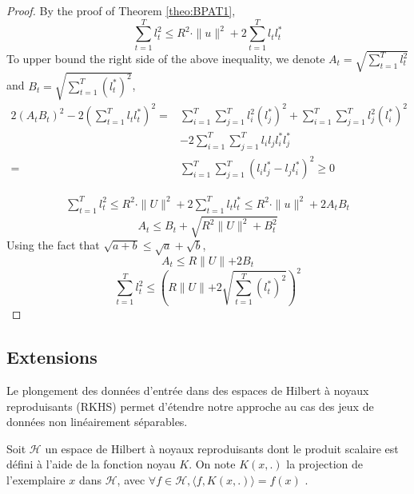 \documentclass[twocolumn]{article}
\begin{document}
\begin{proof}
	By the proof of Theorem \ref{theo:BPAT1}, 
	\[\sum_{t=1}^{T}l_t^2 \leqslant R^2\cdot \parallel{u}\parallel^2 + 2\sum_{t=1}^{T}l_t l_t^{\ast}\]
	To upper bound the right side of the above inequality, we denote $A_t = \sqrt{\sum_{t=1}^{T}l_t^2}$ and $B_t = \sqrt{\sum_{t=1}^{T}(l_t^{\ast})^2}$, 
	\begin{align}
	2(A_tB_t)^2-2(\sum_{t=1}^{T}l_tl_t^{\ast})^2 =& \sum_{i=1}^{T}\sum_{j=1}^{T}l_i^2(l_j^{\ast})^2+\sum_{i=1}^{T}\sum_{j=1}^{T}l_j^2(l_i^{\ast})^2 \nonumber\\
	&- 2\sum_{i=1}^{T}\sum_{j=1}^{T}l_il_jl_i^{\ast}l_j^{\ast}\nonumber\\
	=& \sum_{i=1}^{T}\sum_{j=1}^{T}(l_il_j^{\ast}-l_jl_i^{\ast})^2 \geqslant 0 \nonumber
	\end{align}
	
	\begin{align}
	\sum_{t=1}^{T}l_t^2 \leqslant R^2 \cdot \parallel{U}\parallel^2+2\sum_{t=1}^{T}l_tl_t^{\ast}\leqslant R^2 \cdot \parallel{u}\parallel^2+2A_tB_t
	\end{align}
	\[A_t \leqslant B_t+\sqrt{R^2\parallel{U}\parallel^2+B_t^2}\]
	Using the fact that $\sqrt{a+b}\leqslant \sqrt{a}+\sqrt{b}$,
	\[A_t \leqslant R\parallel{U}\parallel+2 B_t\]
	\[\sum_{t=1}^{T}l_t^2 \leqslant \left(R\parallel{U}\parallel+2 \sqrt{\sum_{t=1}^{T}(l_t^{\ast})^2}\right)^2 \]
\end{proof}


\subsection{Extensions}
Le plongement des données d'entrée dans des espaces de Hilbert à noyaux reproduisants (RKHS) permet d'étendre notre approche au cas des jeux de données non linéairement séparables. 

Soit $\mathcal{H}$ un espace de Hilbert à noyaux reproduisants dont le produit scalaire est défini à l'aide de la fonction noyau $K$. On note $K(x,.)$ la projection de l'exemplaire $x$ dans $\mathcal{H}$, avec $\forall f \in \mathcal{H}, \langle f,K(x,.)\rangle = f(x) $ . 

\end{document}
